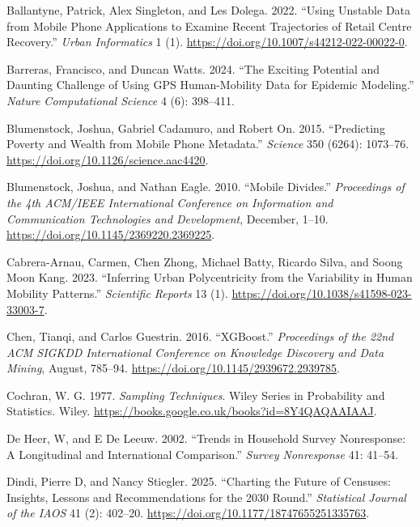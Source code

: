 \documentclass{article}
\newlength{\cslhangindent}
\newenvironment{CSLReferences}[2] %
 {\begin{list}{}{%
  \setlength{\itemindent}{0pt}
  \setlength{\leftmargin}{0pt}
  \setlength{\parsep}{0pt}
  \ifodd #1
   \setlength{\leftmargin}{\cslhangindent}
   \setlength{\itemindent}{-1\cslhangindent}
  \fi
  \setlength{\itemsep}{#2\baselineskip}}}
 {\end{list}}
\begin{document}
\label{refs}
\begin{CSLReferences}{1}{0}
Ballantyne, Patrick, Alex Singleton, and Les Dolega. 2022. {``Using Unstable Data from Mobile Phone Applications to Examine Recent Trajectories of Retail Centre Recovery.''} \emph{Urban Informatics} 1 (1). \url{https://doi.org/10.1007/s44212-022-00022-0}.

Barreras, Francisco, and Duncan Watts. 2024. {``The Exciting Potential and Daunting Challenge of Using GPS Human-Mobility Data for Epidemic Modeling.''} \emph{Nature Computational Science} 4 (6): 398--411.

Blumenstock, Joshua, Gabriel Cadamuro, and Robert On. 2015. {``Predicting Poverty and Wealth from Mobile Phone Metadata.''} \emph{Science} 350 (6264): 1073--76. \url{https://doi.org/10.1126/science.aac4420}.

Blumenstock, Joshua, and Nathan Eagle. 2010. {``Mobile Divides.''} \emph{Proceedings of the 4th ACM/IEEE International Conference on Information and Communication Technologies and Development}, December, 1--10. \url{https://doi.org/10.1145/2369220.2369225}.

Cabrera-Arnau, Carmen, Chen Zhong, Michael Batty, Ricardo Silva, and Soong Moon Kang. 2023. {``Inferring Urban Polycentricity from the Variability in Human Mobility Patterns.''} \emph{Scientific Reports} 13 (1). \url{https://doi.org/10.1038/s41598-023-33003-7}.

Chen, Tianqi, and Carlos Guestrin. 2016. {``XGBoost.''} \emph{Proceedings of the 22nd ACM SIGKDD International Conference on Knowledge Discovery and Data Mining}, August, 785--94. \url{https://doi.org/10.1145/2939672.2939785}.

Cochran, W. G. 1977. \emph{Sampling Techniques}. Wiley Series in Probability and Statistics. Wiley. \url{https://books.google.co.uk/books?id=8Y4QAQAAIAAJ}.

De Heer, W, and E De Leeuw. 2002. {``Trends in Household Survey Nonresponse: A Longitudinal and International Comparison.''} \emph{Survey Nonresponse} 41: 41--54.

Dindi, Pierre D, and Nancy Stiegler. 2025. {``Charting the Future of Censuses: Insights, Lessons and Recommendations for the 2030 Round.''} \emph{Statistical Journal of the IAOS} 41 (2): 402--20. \url{https://doi.org/10.1177/18747655251335763}.


\end{CSLReferences}
\end{document}
